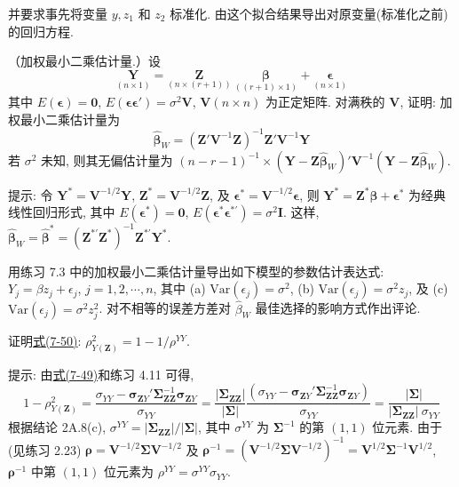 
并要求事先将变量 $y,z_1$ 和 $z_2$ 标准化. 由这个拟合结果导出对原变量(标准化之前)的回归方程.

\medskip
{}\quad （加权最小二乘估计量.）设
\[
\underset{(n\times 1)}{\mathbf{Y}}=\underset{(n\times(r+1))}{\mathbf{Z}}\ \underset{((r+1)\times 1)}{\boldsymbol{\beta}}+\underset{(n\times 1)}{\boldsymbol{\epsilon}}
\]
其中 $E(\boldsymbol{\epsilon})=\mathbf{0}$, $E(\boldsymbol{\epsilon}\boldsymbol{\epsilon}')=\sigma^2\mathbf{V}$, $\mathbf{V}(n\times n)$ 为正定矩阵. 对满秩的 $\mathbf{V}$, 证明: 加权最小二乘估计量为
\[
\hat{\boldsymbol{\beta}}_W=(\mathbf{Z}'\mathbf{V}^{-1}\mathbf{Z})^{-1}\mathbf{Z}'\mathbf{V}^{-1}\mathbf{Y}
\]
若 $\sigma^2$ 未知, 则其无偏估计量为 $(n-r-1)^{-1}\times(\mathbf{Y}-\mathbf{Z}\hat{\boldsymbol{\beta}}_W)'\mathbf{V}^{-1}(\mathbf{Y}-\mathbf{Z}\hat{\boldsymbol{\beta}}_W)$.

提示: 令 $\mathbf{Y}^*=\mathbf{V}^{-1/2}\mathbf{Y}$, $\mathbf{Z}^*=\mathbf{V}^{-1/2}\mathbf{Z}$, 及 $\boldsymbol{\epsilon}^*=\mathbf{V}^{-1/2}\boldsymbol{\epsilon}$, 则 $\mathbf{Y}^*=\mathbf{Z}^*\boldsymbol{\beta}+\boldsymbol{\epsilon}^*$ 为经典线性回归形式, 其中 $E(\boldsymbol{\epsilon}^*)=\mathbf{0}$, $E(\boldsymbol{\epsilon}^*\boldsymbol{\epsilon}^{*'})=\sigma^2\mathbf{I}$. 这样, $\hat{\boldsymbol{\beta}}_W=\hat{\boldsymbol{\beta}}^*=(\mathbf{Z}^{*'}\mathbf{Z}^*)^{-1}\mathbf{Z}^{*'}\mathbf{Y}^*$.

\quad 用练习 7.3 中的加权最小二乘估计量导出如下模型的参数估计表达式: $Y_j=\beta z_j+\epsilon_j$, $j=1,2,\cdots,n$, 其中 (a) $\mathrm{Var}(\epsilon_j)=\sigma^2$, (b) $\mathrm{Var}(\epsilon_j)=\sigma^2z_j$, 及 (c) $\mathrm{Var}(\epsilon_j)=\sigma^2z_j^2$. 对不相等的误差方差对 $\hat{\beta}_W$ 最佳选择的影响方式作出评论.

\quad 证明\hyperref[eq:7-50]{式(7-50)}: $\rho_{Y(\mathbf{Z})}^2=1-1/\rho^{YY}$.

提示: 由\hyperref[eq:7-49]{式(7-49)}和练习 4.11 可得,
\[
1-\rho_{Y(\mathbf{Z})}^2
=\frac{\sigma_{YY}-\boldsymbol{\sigma}_{\mathbf{Z}Y}'\boldsymbol{\Sigma}_{\mathbf{Z}\mathbf{Z}}^{-1}\boldsymbol{\sigma}_{\mathbf{Z}Y}}{\sigma_{YY}}
=\frac{|\boldsymbol{\Sigma}_{\mathbf{Z}\mathbf{Z}}|}{|\boldsymbol{\Sigma}|}\frac{(\sigma_{YY}-\boldsymbol{\sigma}_{\mathbf{Z}Y}'\boldsymbol{\Sigma}_{\mathbf{Z}\mathbf{Z}}^{-1}\boldsymbol{\sigma}_{\mathbf{Z}Y})}{\sigma_{YY}}
=\frac{|\boldsymbol{\Sigma}|}{|\boldsymbol{\Sigma}_{\mathbf{Z}\mathbf{Z}}|\ \sigma_{YY}}
\]
根据结论 2A.8(c), $\sigma^{YY}=|\boldsymbol{\Sigma}_{\mathbf{Z}\mathbf{Z}}|/|\boldsymbol{\Sigma}|$, 其中 $\sigma^{YY}$ 为 $\boldsymbol{\Sigma}^{-1}$ 的第 $(1,1)$ 位元素. 由于(见练习 2.23) $\boldsymbol{\rho}=\mathbf{V}^{-1/2}\boldsymbol{\Sigma}\mathbf{V}^{-1/2}$ 及 $\boldsymbol{\rho}^{-1}=(\mathbf{V}^{-1/2}\boldsymbol{\Sigma}\mathbf{V}^{-1/2})^{-1}=\mathbf{V}^{1/2}\boldsymbol{\Sigma}^{-1}\mathbf{V}^{1/2}$, $\boldsymbol{\rho}^{-1}$ 中第 $(1,1)$ 位元素为 $\rho^{YY}=\sigma^{YY}\sigma_{YY}$.

